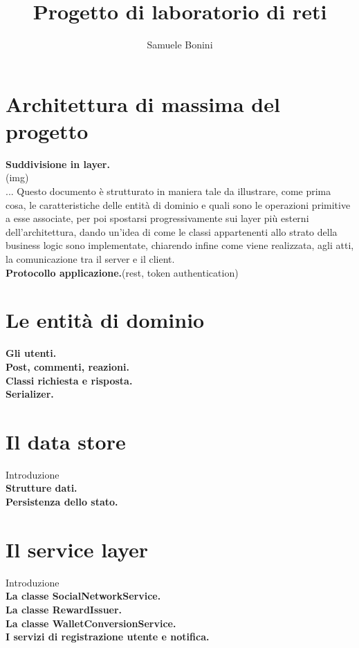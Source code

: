 \documentclass[a4paper,8pt]{article} %
\title{Progetto di laboratorio di reti} %
\author{Samuele Bonini}
\date{}
\begin{document}
\maketitle %



\tableofcontents %
\begin{flushleft}

    \section{Architettura di massima del progetto} %
    \textbf{Suddivisione in layer.}\quad \\ (img)\\
    ... Questo documento è strutturato in maniera tale da illustrare, come prima cosa, le caratteristiche delle entità
    di dominio e quali sono le operazioni primitive a esse associate, per poi spostarsi progressivamente sui layer
    più esterni dell'architettura, dando un'idea di come le classi appartenenti allo strato della business logic sono
    implementate, chiarendo infine come viene realizzata, agli atti, la comunicazione tra il server e il client.\\
    \textbf{Protocollo applicazione.}\quad (rest, token authentication)\\


    \section{Le entità di dominio}
    \textbf{Gli utenti.}\quad \\
    \textbf{Post, commenti, reazioni.}\quad \\
    \textbf{Classi richiesta e risposta.}\quad \\
    \textbf{Serializer.}\quad \\


    \section{Il data store}
    Introduzione\\
    \textbf{Strutture dati.}\quad \\
    \textbf{Persistenza dello stato.}\quad \\


    \section{Il service layer}
    Introduzione\\
    \textbf{La classe SocialNetworkService.}\quad \\
    \textbf{La classe RewardIssuer.}\quad \\
    \textbf{La classe WalletConversionService.}\quad \\
    \textbf{I servizi di registrazione utente e notifica.}\quad \\





\end{flushleft}
\end{document}
